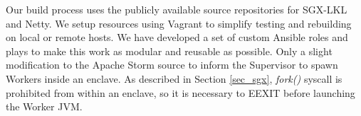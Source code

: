 Our build process uses the publicly available source repositories for SGX-LKL and Netty. We setup resources using Vagrant to simplify testing and rebuilding on local or remote hosts. We have developed a set of custom Ansible roles and plays to make this work as modular and reusable as possible. Only a slight modification to the Apache Storm source to inform the Supervisor to spawn Workers inside an enclave. As described in Section \ref{sec_sgx}, \textit{fork()} syscall is prohibited from within an enclave, so it is necessary to EEXIT before launching the Worker JVM. 